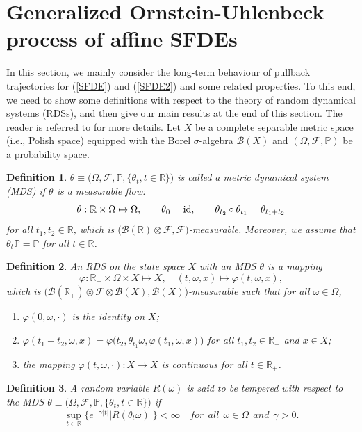 \documentclass[preprint,12pt]{elsarticle}
\newtheorem{definition}{Definition}[section]
\begin{document}
\section{Generalized Ornstein-Uhlenbeck process of affine SFDEs}
In this section, we mainly consider the long-term behaviour of pullback trajectories for (\ref{SFDE}) and (\ref{SFDE2}) and some related properties. To this end, we need to show some definitions with respect to the theory of random dynamical systems (RDSs), and then give our main results at the end of this section. The reader is referred to \cite{A,Chu} for more details.
Let $X$ be a complete separable metric space (i.e., Polish space) equipped with the Borel $\sigma$-algebra $\mathscr{B}(X)$ and $(\Omega,\mathscr{F},\mathbb{P})$ be a probability space.

\begin{definition}
$\theta\equiv\bigl(\Omega,\mathscr{F},\mathbb{P},\{\theta_t,t\in\mathbb{R}\}\bigr)$ is called a metric dynamical system (MDS) if $\theta$ is a measurable flow:
\[\theta:\mathbb{R}\times\Omega\mapsto\Omega,\qquad \theta_0={\rm id},\qquad \theta_{t_2}\circ\theta_{t_1}=\theta_{t_1+t_2}\]
for all $t_1,t_2\in\mathbb{R}$, which is $\bigl(\mathscr{B}(\mathbb{R})\otimes\mathscr{F}, \mathscr{F}\bigr)$-measurable. Moreover, we assume that $\theta_t\mathbb{P}=\mathbb{P}$ for all $t\in\mathbb{R}$.
\end{definition}

\begin{definition}\label{DRDS}
An RDS on the state space $X$ with an MDS $\theta$ is a mapping
\[\varphi:\mathbb{R}_+\times\Omega\times X\mapsto X, \quad (t,\omega,x)\mapsto\varphi(t,\omega,x),\]
which is $\bigl(\mathscr{B}(\mathbb{R}_+)\otimes\mathscr{F}\otimes\mathscr{B}(X),
\mathscr{B}(X)\bigr)$-measurable such that for all $\omega\in\Omega$,
\begin{enumerate}[{\rm(i)}]
\item $\varphi(0,\omega,\cdot)$ is the identity on $X$;
\item $\varphi(t_1+t_2,\omega,x)=\varphi\bigl(t_2,\theta_{t_1}\omega,\varphi(t_1,\omega,x)\bigr)$ for all $t_1,t_2\in\mathbb{R}_+$ and $x\in X$;
\item the mapping $\varphi(t,\omega,\cdot):X\to X$ is continuous for all $t\in
\mathbb{R}_+$.
\end{enumerate}
\end{definition}

\begin{definition}\label{Tem}
A random variable $R(\omega)$ is said to be tempered with respect to the MDS $\theta\equiv\bigl(\Omega,\mathscr{F},\mathbb{P},\{\theta_t,t\in\mathbb{R}\}\bigr)$ if
\[\sup_{t\in\mathbb{R}}\bigl\{e^{-\gamma|t|}|R(\theta_{t}\omega)|\bigr\}<\infty\quad for\ \ all\ \ \omega\in\Omega\ \ and\ \ \gamma>0.\]
\end{definition}
\end{document}

